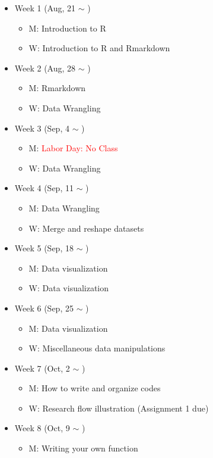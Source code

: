 \documentclass[12pt]{article}
\begin{document}
\begin{itemize}
  \item Week 1 (Aug, 21 $\sim$ )
  \begin{itemize}
    \item M: Introduction to R
    \item W: Introduction to R and Rmarkdown
  \end{itemize}
  \item Week 2 (Aug, 28 $\sim$ )
  \begin{itemize}
    \item M: Rmarkdown
    \item W: Data Wrangling
  \end{itemize}
  \item Week 3 (Sep, 4 $\sim$ )
  \begin{itemize}
    \item M: \textcolor{red}{Labor Day: No Class}
    \item W: Data Wrangling
  \end{itemize}
  \item Week 4 (Sep, 11 $\sim$ )
  \begin{itemize}
    \item M: Data Wrangling
    \item W: Merge and reshape datasets
  \end{itemize}
  \item Week 5 (Sep, 18 $\sim$ )
  \begin{itemize}
    \item M: Data visualization 
    \item W: Data visualization
  \end{itemize}
  \item Week 6 (Sep, 25 $\sim$ )
  \begin{itemize}
    \item M: Data visualization
    \item W: Miscellaneous data manipulations
  \end{itemize}
  \item Week 7 (Oct, 2 $\sim$ )
  \begin{itemize}
    \item M: How to write and organize codes
    \item W: Research flow illustration (Assignment 1 due)
  \end{itemize}
  \item Week 8 (Oct, 9 $\sim$ )
  \begin{itemize}
    \item M: Writing your own function

\end{itemize}
\end{itemize}
\end{document}

